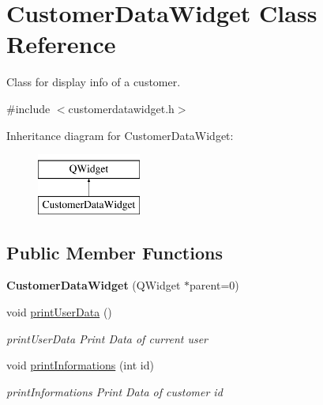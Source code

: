 \hypertarget{classCustomerDataWidget}{\section{Customer\+Data\+Widget Class Reference}
\label{classCustomerDataWidget}
}


Class for display info of a customer.  




{\ttfamily \#include $<$customerdatawidget.\+h$>$}

Inheritance diagram for Customer\+Data\+Widget\+:\begin{figure}[H]
\begin{center}
\leavevmode
\includegraphics[height=2.000000cm]{df/df4/classCustomerDataWidget}
\end{center}
\end{figure}
\subsection*{Public Member Functions}
\begin{DoxyCompactItemize}
\item 
\hypertarget{classCustomerDataWidget_ae629d9d3839bd9f067927b19e1bb85cd}{{\bfseries Customer\+Data\+Widget} (Q\+Widget $\ast$parent=0)}\label{classCustomerDataWidget_ae629d9d3839bd9f067927b19e1bb85cd}

\item 
\hypertarget{classCustomerDataWidget_a9a56bd1d7faf76d083cfa97f2883bdf1}{void \hyperlink{classCustomerDataWidget_a9a56bd1d7faf76d083cfa97f2883bdf1}{print\+User\+Data} ()}\label{classCustomerDataWidget_a9a56bd1d7faf76d083cfa97f2883bdf1}

\begin{DoxyCompactList}\small\item\em print\+User\+Data Print Data of current user \end{DoxyCompactList}\item 
void \hyperlink{classCustomerDataWidget_ab61052cc337e51d1e34149d67816c58f}{print\+Informations} (int id)
\begin{DoxyCompactList}\small\item\em print\+Informations Print Data of customer id \end{DoxyCompactList}\end{DoxyCompactItemize}


